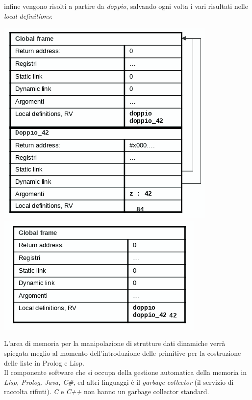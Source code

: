 \documentclass[a4paper,12pt, oneside]{book}
\begin{document}
infine vengono risolti a partire da \textit{doppio}, salvando ogni volta i vari risultati nelle \textit{local definitions}:
\begin{center}
	\includegraphics[scale=0.4]{img/sta6.png}
	\quad
	\includegraphics[scale=0.4]{img/sta7.png}
\end{center}
L'area di memoria per la manipolazione di strutture dati dinamiche verrà spiegata meglio al momento dell'introduzione delle primitive per la costruzione delle liste in Prolog e Lisp.\\
Il componente software che si occupa della gestione automatica della memoria in \textit{Lisp, Prolog, Java, C\#}, ed altri linguaggi è il \textit{garbage collector} (il servizio di raccolta rifiuti). \textit{C} e \textit{C++} non hanno un garbage collector standard.
\end{document}
